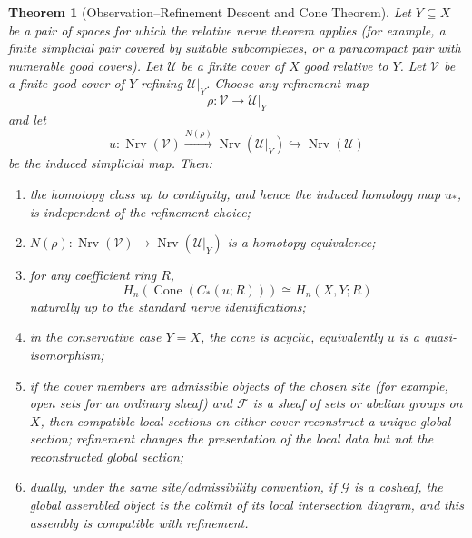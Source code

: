 \documentclass[11pt]{article}
\newtheorem{theorem}{Theorem}[section]
\newcommand{\Cone}{\operatorname{Cone}}
\newcommand{\Nrv}{\operatorname{Nrv}}
\begin{document}
\begin{theorem}[Observation--Refinement Descent and Cone Theorem]\label{thm:main}
Let $Y\subseteq X$ be a pair of spaces for which the relative nerve theorem applies (for example, a finite simplicial pair covered by suitable subcomplexes, or a paracompact pair with numerable good covers).  Let $\mathcal U$ be a finite cover of $X$ good relative to $Y$.  Let $\mathcal V$ be a finite good cover of $Y$ refining $\mathcal U|_Y$.  Choose any refinement map
\[
\rho:\mathcal V\longrightarrow\mathcal U|_Y
\]
and let
\[
u:
\Nrv(\mathcal V)\xrightarrow{N(\rho)}\Nrv(\mathcal U|_Y)
\hookrightarrow\Nrv(\mathcal U)
\]
be the induced simplicial map.  Then:
\begin{enumerate}[label=(\alph*)]
\item the homotopy class up to contiguity, and hence the induced homology map $u_*$, is independent of the refinement choice;
\item $N(\rho):\Nrv(\mathcal V)\to\Nrv(\mathcal U|_Y)$ is a homotopy equivalence;
\item for any coefficient ring $R$,
\[
H_n\!\left(\Cone(C_*(u;R))\right)
\cong H_n(X,Y;R)
\]
naturally up to the standard nerve identifications;
\item in the conservative case $Y=X$, the cone is acyclic, equivalently $u$ is a quasi-isomorphism;
\item if the cover members are admissible objects of the chosen site (for example, open sets for an ordinary sheaf) and $\mathcal F$ is a sheaf of sets or abelian groups on $X$, then compatible local sections on either cover reconstruct a unique global section; refinement changes the presentation of the local data but not the reconstructed global section;
\item dually, under the same site/admissibility convention, if $\mathcal G$ is a cosheaf, the global assembled object is the colimit of its local intersection diagram, and this assembly is compatible with refinement.
\end{enumerate}
\end{theorem}
\end{document}

